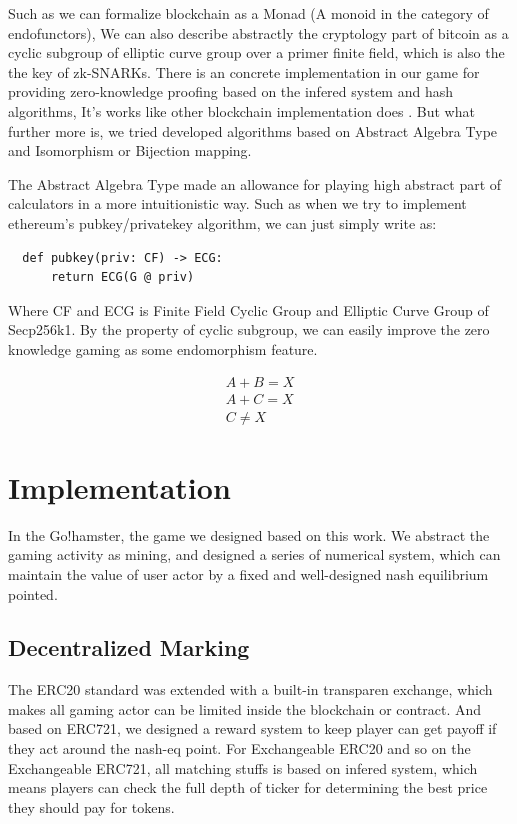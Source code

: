 \documentclass[twocolumn]{article}
\begin{document}
Such as we can formalize blockchain as a Monad (A monoid in the category of endofunctors), We can also describe abstractly the cryptology part of bitcoin as a cyclic subgroup of elliptic curve group over a primer finite field, which is also the the key of zk-SNARKs. There is an concrete implementation in our game for providing zero-knowledge proofing based on the infered system and hash algorithms, It's works like other blockchain implementation does \cite{zcash}. But what further more is, we tried developed algorithms based on Abstract Algebra Type and Isomorphism or Bijection mapping.

The Abstract Algebra Type made an allowance for playing high abstract part of calculators in a more intuitionistic way. Such as when we try to implement ethereum's pubkey/privatekey algorithm, we can just simply write as\cite{klefki}:

\lstset{language=Python}
\begin{lstlisting}
  def pubkey(priv: CF) -> ECG:
      return ECG(G @ priv)
\end{lstlisting}

Where CF and ECG is Finite Field Cyclic Group and Elliptic Curve Group of Secp256k1. By the property of cyclic subgroup, we can easily improve the zero knowledge gaming as some endomorphism feature.

\begin{gather}
  A + B = X \\
  A + C = X \\
  C \neq X
\end{gather}

\section {Implementation}

In the Go!hamster, the game we designed based on this work. We abstract the gaming activity as mining, and designed a series of numerical system, which can maintain the value of user actor by a fixed and well-designed nash equilibrium pointed. 
\subsection {Decentralized Marking}

The ERC20 standard was extended with a built-in transparen exchange, which makes all gaming actor can be limited inside the blockchain or contract. And based on ERC721, we designed a reward system to keep player can get payoff if they act around the nash-eq point. For Exchangeable ERC20 and so on the Exchangeable ERC721, all matching stuffs is based on infered system, which means players can check the full depth of ticker for determining the best price they should pay for tokens.
\end{document}
